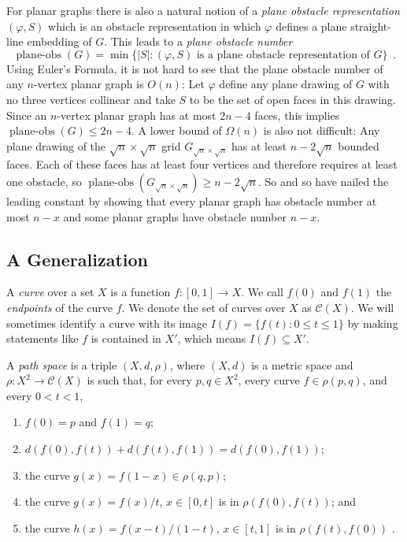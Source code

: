\documentclass{patmorin}
\DeclareMathOperator{\planeobs}{plane-obs}
\begin{document}
For planar graphs there is also a natural notion of a \emph{plane obstacle
representation} $(\varphi, S)$ which is an obstacle representation
in which $\varphi$ defines a plane straight-line embedding of $G$.
This leads to a \emph{plane obstacle number}
\[
    \planeobs(G) = \min\{|S| :\text{$(\varphi, S)$ is a plane obstacle representation of $G$}\} \enspace .
\]
Using Euler's Formula, it is not hard to see that the plane obstacle
number of any $n$-vertex planar graph is $O(n)$: Let $\varphi$ define
any plane drawing of $G$ with no three vertices collinear and take $S$
to be the set of open faces in this drawing.  Since an $n$-vertex planar
graph has at most $2n-4$ faces, this implies $\planeobs(G)\le 2n-4$.
A lower bound of $\Omega(n)$ is also not difficult:  Any plane drawing
of the $\sqrt{n}\times\sqrt{n}$ grid $G_{\sqrt{n}\times\sqrt{n}}$
has at least $n-2\sqrt{n}$ bounded faces. Each of these faces has
at least four vertices and therefore requires at least one obstacle,
so $\planeobs(G_{\sqrt{n}\times\sqrt{n}})\ge n-2\sqrt{n}$.  So and so
\cite{X} have nailed the leading constant by showing that every planar
graph has obstacle number at most $n-x$ and some planar graphs have
obstacle number $n-x$.

\subsection{A Generalization}

A \emph{curve} over a set $X$ is a function $f:[0,1]\to X$.  We call
$f(0)$ and $f(1)$ the \emph{endpoints} of the curve $f$. We denote the
set of curves over $X$ as $\mathcal{C}(X)$.  We will sometimes identify
a curve with its image $I(f)=\{f(t):0\le t\le 1\}$ by making statements like
$f$ is contained in $X'$, which means $I(f)\subseteq X'$.

A \emph{path space} is a triple $(X,d,\rho)$, where $(X,d)$ is a metric
space and $\rho:X^2\to \mathcal{C}(X)$ is such that, for every $p,q\in
X^2$, every curve $f\in \rho(p,q)$, and every $0<t<1$,
\begin{enumerate}
  \item $f(0)=p$ and $f(1)=q$;
  \item $d(f(0),f(t)) + d(f(t),f(1)) = d(f(0),f(1))$; 
  \item the curve $g(x)=f(1-x)\in \rho(q,p)$;
  \item the curve $g(x)=f(x)/t$, $x\in[0,t]$ is in $\rho(f(0),f(t))$; and
  \item the curve $h(x)=f(x-t)/(1-t)$, $x\in[t,1]$ is in $\rho(f(t),f(0))$ \enspace .
\end{enumerate} 
\end{document}
